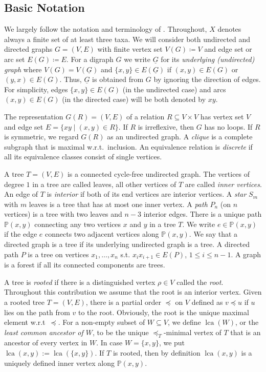 \documentclass[smallextended]{svjour3}
\let\cite\citep
\newcommand{\rev}[1]{\begingroup\color{blue}#1\endgroup}
\newcommand{\lca}[1]{\mathop{lca}(#1)}
\begin{document}
\subsection{Basic Notation} 

We largely follow the notation and terminology of
\cite{sem-ste-03a}. Throughout, $X$ denotes always a finite set of at least
three taxa. We will consider both undirected and directed graphs $G=(V,E)$
with finite vertex set $V(G)\coloneqq V$ and edge set or arc set
$E(G)\coloneqq E$.  For a digraph $G$ we write $\underline{G}$ for its
\emph{underlying (undirected) graph} where $V(G)=V(\underline{G})$ and
$\{x,y\}\in E(\underline{G})$ if $(x,y)\in E(G)$ or $(y,x)\in E(G)$. Thus,
$\underline{G}$ is obtained from $G$ by ignoring the direction of edges.
For simplicity, edges $\{x,y\}\in E(G)$ (in the undirected case) and arcs
$(x,y)\in E(G)$ (in the directed case) will be both denoted by $xy$.

The representation $G(R)=(V,E)$ of a relation $R\subseteq V\times V$ has
vertex set $V$ and edge set $E=\{xy\mid (x,y)\in R\}$. If $R$ is
irreflexive, then $G$ has no loops. If $R$ is symmetric, we regard $G(R)$
as an undirected graph. A \emph{clique} is a complete subgraph that is
maximal w.r.t.\ inclusion. An equivalence relation is \emph{discrete} if
all its equivalence classes consist of single vertices.

A tree $T=(V,E)$ is a connected cycle-free undirected graph.  The vertices
of degree $1$ in a tree are called leaves, all other vertices of $T$ are
called \emph{inner vertices}. An edge of $T$ is \emph{interior} if both of
its end vertices are interior vertices. A \emph{star} $S_m$ with $m$ leaves
is a tree that has at most one inner vertex. A \emph{path} $P_n$ (on $n$
vertices) is a tree with two leaves and $n-3$ interior edges.  There is a
unique path $\mathbb{P}(x,y)$ connecting any two vertices $x$ and $y$ in a
tree $T$. We write $e\in\mathbb{P}(x,y)$ if the edge $e$ connects two
adjacent vertices along $\mathbb{P}(x,y)$.  We say that a directed graph is
a tree if its underlying undirected graph is a tree.  A directed path $P$
is a tree on vertices $x_1,\dots,x_n$ s.t. $x_ix_{i+1}\in E(P)$, $1\leq
i\leq n-1$. A graph is a forest if all its connected components are trees.

A tree is \emph{rooted} if there is a distinguished vertex $\rho\in V$
called the \emph{root}. Throughout this contribution we assume that the
root is an interior vertex. \rev{  Given a rooted tree $T=(V,E)$, there is a partial
order $\preceq$ on $V$ defined as  $ v \preceq u$ if 
$u$ lies on the path from $v$ to the root. Obviously,
the root is the unique maximal element w.r.t\ $\preceq$.
For a non-empty subset of $W\subseteq V$, we define $\lca{W}$, or
the \emph{least common ancestor of $W$}, to be the unique
$\preceq_T$-minimal vertex of $T$ that is an ancestor of every vertex in
$W$. In case $W=\{x,y \}$, we put $\lca{x,y}:=\lca{\{x,y\}}$.}
If $T$ is rooted, then by definition $\lca{x,y}$ is a uniquely defined
inner vertex along $\mathbb{P}(x,y)$.
\end{document}
